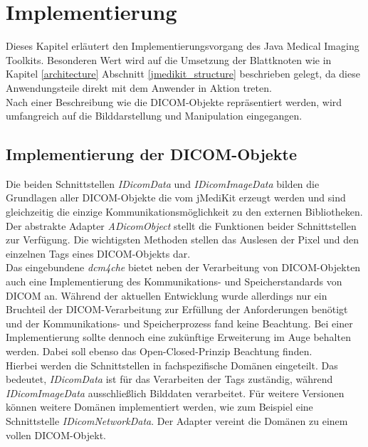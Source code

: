\chapter{Implementierung} \label{implementation}

Dieses Kapitel erläutert den Implementierungsvorgang des Java Medical Imaging Toolkits. Besonderen Wert wird auf die Umsetzung der Blattknoten wie in Kapitel \ref{architecture} Abschnitt \ref{jmedikit_structure} beschrieben gelegt, da diese Anwendungsteile direkt mit dem Anwender in Aktion treten.\\
Nach einer Beschreibung wie die DICOM-Objekte repräsentiert werden, wird umfangreich auf die Bilddarstellung und Manipulation eingegangen.

\FloatBarrier
\section{Implementierung der DICOM-Objekte}

Die beiden Schnittstellen \textit{IDicomData} und \textit{IDicomImageData} bilden die Grundlagen aller DICOM-Objekte die vom jMediKit erzeugt werden und sind gleichzeitig die einzige Kommunikationsmöglichkeit zu den externen Bibliotheken. Der abstrakte Adapter \textit{ADicom\-Object} stellt die Funktionen beider Schnittstellen zur Verfügung. Die wichtigsten Methoden stellen das Auslesen der Pixel und den einzelnen Tags eines DICOM-Objekts dar. \\
Das eingebundene \textit{dcm4che} bietet neben der Verarbeitung von DICOM-Objekten auch eine Implementierung des Kommunikations- und Speicherstandards von DICOM an. Während der aktuellen Entwicklung wurde allerdings nur ein Bruchteil der DICOM-Verarbeitung zur Erfüllung der Anforderungen benötigt und der Kommunikations- und Speicherprozess fand keine Beachtung. Bei einer Implementierung sollte dennoch eine zukünftige Erweiterung im Auge behalten werden. Dabei soll ebenso das Open-Closed-Prinzip Beachtung finden.\\
Hierbei werden die Schnittstellen in fachspezifische Domänen eingeteilt. Das bedeutet, \textit{IDicomData} ist für das Verarbeiten der Tags zuständig, während \textit{IDicomImageData} ausschließlich Bilddaten verarbeitet. Für weitere Versionen können weitere Domänen implementiert werden, wie zum Beispiel eine Schnittstelle \textit{IDicomNetworkData}. Der Adapter vereint die Domänen zu einem vollen DICOM-Objekt. 

